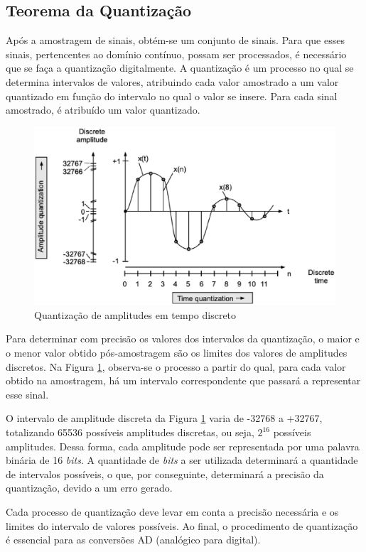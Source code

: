 \subsection{Teorema da Quantização}

Após a amostragem de sinais, obtém-se um conjunto de sinais. Para que esses sinais, pertencentes ao domínio contínuo, possam ser processados, é necessário que se faça a quantização digitalmente. A quantização é um processo no qual se determina intervalos de valores, atribuindo cada valor amostrado a um valor quantizado em função do intervalo no qual o valor se insere. Para cada sinal amostrado, é atribuído um valor quantizado.

\begin{figure}[h]
	\centering
    \includegraphics[scale=0.4]{figuras/fig04.eps}
	\caption{Quantização de amplitudes em tempo discreto \cite{oppenheim2010sinais}}
	\label{fig04}
\end{figure}

Para determinar com precisão os valores dos intervalos da quantização, o maior e o menor valor obtido pós-amostragem são os limites dos valores de amplitudes discretos. Na Figura \ref{fig04}, observa-se o processo a partir do qual, para cada valor obtido na amostragem, há um intervalo correspondente que passará a representar esse sinal.
\par O intervalo de amplitude discreta da Figura \ref{fig04} varia de -32768 a +32767, totalizando 65536 possíveis amplitudes discretas, ou seja, $2^{16}$ possíveis amplitudes. Dessa forma, cada amplitude pode ser representada por uma palavra binária de 16 \textit{bits}. A quantidade de \textit{bits} a ser utilizada determinará a quantidade de intervalos possíveis, o que, por conseguinte, determinará a precisão da quantização, devido a um erro gerado.
\par Cada processo de quantização deve levar em conta a precisão necessária e os limites do intervalo de valores possíveis. Ao final, o procedimento de quantização é essencial para as conversões AD (analógico para digital).

